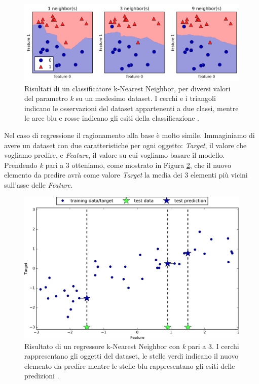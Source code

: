\documentclass[a4paper,12pt]{report}
\begin{document}
\begin{figure}[ht]
    \centering
    \includegraphics[scale = 0.2]{images/knearest_differenza_vicini.png}
    \caption{Risultati di un classificatore k-Nearest Neighbor, per diversi valori del parametro \textit{k} su un medesimo dataset. I cerchi e i triangoli indicano le osservazioni del dataset appartenenti a due classi, mentre le aree blu e rosse indicano gli esiti della classificazione \cite{figure_copyright}.}
    \label{fig:differenza_vicini}
\end{figure}

Nel caso di regressione il ragionamento alla base è molto simile. Immaginiamo di avere un dataset con due caratteristiche per ogni oggetto: \textit{Target}, il valore che vogliamo predire, e \textit{Feature}, il valore su cui vogliamo basare il modello. Prendendo \textit{k} pari a 3 otteniamo, come mostrato in Figura \ref{fig:knearest_regression}, che il nuovo elemento da predire avrà come valore \textit{Target} la media dei 3 elementi più vicini sull'asse delle \textit{Feature}.

\begin{figure}[h]
    \centering
    \includegraphics[scale = 0.19]{images/knearese_regression_3k.png}
    \caption{Risultato di un regressore k-Nearest Neighbor con \textit{k} pari a 3. I cerchi rappresentano gli oggetti del dataset, le stelle verdi indicano il nuovo elemento da predire mentre le stelle blu rappresentano gli esiti delle predizioni \cite{figure_copyright}.}
    \label{fig:knearest_regression}
\end{figure}
\end{document}
